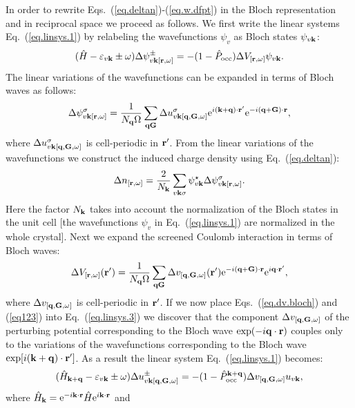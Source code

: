\documentclass[twocolumn,prb,showpacs,superscriptaddress]{revtex4}
\def\w{\omega}
\def\H{\hat{H}}
\def\P{\hat{P}_{\rm occ}}
\def\E{\varepsilon}
\def\q{{\bf q}}
\def\s{\sigma}
\def\k{{\bf k}}
\def\G{{\bf G}}
\def\r{{\bf r}}
\def\rp{{\bf r^\prime}}
\begin{document}
In order to rewrite Eqs.\ (\ref{eq.deltan})-(\ref{eq.w.dfpt}) in
the Bloch representation and in reciprocal space we proceed as follows.
We first write the linear systems Eq.\ (\ref{eq.linsys.1})
by relabeling the wavefunctions $\psi_v$ as Bloch states $\psi_{v\k}$:
  \begin{equation}\label{eq.linsys.3}
  (\H-\E_{v\k}\pm\w) \Delta \psi^\pm_{v\k[\r,\w]}  = -(1-\P)  \Delta V_{[\r,\w]} \psi_{v\k}.
  \end{equation}
The linear variations of the wavefunctions can be expanded in terms
of Bloch waves as follows:
  \begin{equation}\label{eq123}
  \Delta \psi^\sigma_{v\k[\r,\w]} = \frac{1}{N_\q\Omega} \sum_{\q\G} \Delta u^\sigma_{v\k[\q,\G,\w]}
  {\rm e}^{i(\k+\q)\cdot\rp} {\rm e}^{-i(\q+\G)\cdot\r},
  \end{equation}
where $\Delta u^\sigma_{v\k[\q,\G,\w]}$ is cell-periodic in $\rp$.
From the linear variations of the wavefunctions we construct the
induced charge density using Eq.\ (\ref{eq.deltan}):
  \begin{equation}\label{eq.ch}
  \Delta n_{[\r,\w]} = \frac{2}{N_\k}\sum_{v\k\s} \psi_{v\k}^\star  \Delta \psi^\s_{v\k[\r,\w]}.
  \end{equation}
Here the factor $N_\k$ takes into account the normalization of
the Bloch states in the unit cell [the 
wavefunctions $\psi_v$ in Eq.\ (\ref{eq.linsys.1}) are normalized 
in the whole crystal].
Next we expand the screened Coulomb interaction in terms
of Bloch waves: 
  \begin{equation}\label{eq.dv.bloch}
  \Delta V_{[\r,\w]} (\rp) = \frac{1}{N_\q\Omega}  \sum_{\q\G} \Delta v_{[\q,\G,\w]}(\rp) 
   {\rm e}^{-i(\q+\G)\cdot\r} {\rm e}^{i\q\cdot\rp}, 
  \end{equation}
where $\Delta v_{[\q,\G,\w]}$ is cell-periodic in $\rp$.
If we now place Eqs.\ (\ref{eq.dv.bloch}) and (\ref{eq123}) into Eq.\ (\ref{eq.linsys.3})
we discover that the component $\Delta v_{[\q,\G,\w]}$ of the
perturbing potential corresponding to the Bloch wave ${\rm exp}(-i\q\cdot\r)$
couples only to the variations of the wavefunctions corresponding to
the Bloch wave ${\rm exp}[i(\k+\q)\cdot\rp]$.
As a result the linear system Eq.\ (\ref{eq.linsys.1}) becomes:
  \begin{equation}\label{eq.linsys.4}
  (\H_{\k+\q}-\E_{v\k}\pm\w) \Delta u^\pm_{v\k[\q,\G,\w]}  = -(1-\P^{\k+\q}) \Delta v_{[\q,\G,\w]} u_{v\k},
  \end{equation}
where $\H_\k= {\rm e}^{-i\k\cdot\r} \H {\rm e}^{i\k\cdot\r}$ and
\end{document}
